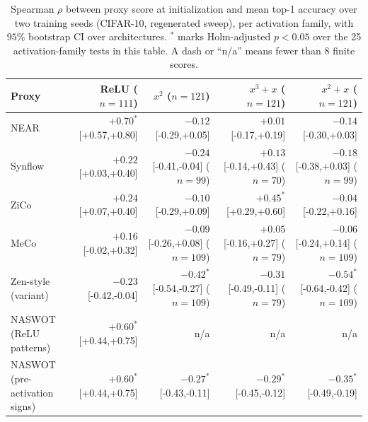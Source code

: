 \begin{table}[h]
\centering
\caption{Spearman $\rho$ between proxy score at initialization and mean top-1 accuracy over two training seeds
  (CIFAR-10, regenerated sweep), per activation family, with $95\%$ bootstrap CI over architectures.
  ${}^{*}$ marks Holm-adjusted $p<0.05$ over the 25 activation-family tests in this table.
  A dash or ``n/a'' means fewer than $8$ finite scores.}
\label{tab:corr}
\small
\begin{tabular}{lrrrr}
\toprule
\textbf{Proxy} & \textbf{ReLU} ($n{=}111$) & \textbf{$x^2$} ($n{=}121$) & \textbf{$x^3{+}x$} ($n{=}121$) & \textbf{$x^2{+}x$} ($n{=}121$) \\
\midrule
NEAR & $+0.70^{*}$ {\scriptsize[+0.57,+0.80]} & $-0.12$ {\scriptsize[-0.29,+0.05]} & $+0.01$ {\scriptsize[-0.17,+0.19]} & $-0.14$ {\scriptsize[-0.30,+0.03]} \\
Synflow & $+0.22$ {\scriptsize[+0.03,+0.40]} & $-0.24$ {\scriptsize[-0.41,-0.04]} {\scriptsize($n{=}99$)} & $+0.13$ {\scriptsize[-0.14,+0.43]} {\scriptsize($n{=}70$)} & $-0.18$ {\scriptsize[-0.38,+0.03]} {\scriptsize($n{=}99$)} \\
ZiCo & $+0.24$ {\scriptsize[+0.07,+0.40]} & $-0.10$ {\scriptsize[-0.29,+0.09]} & $+0.45^{*}$ {\scriptsize[+0.29,+0.60]} & $-0.04$ {\scriptsize[-0.22,+0.16]} \\
MeCo & $+0.16$ {\scriptsize[-0.02,+0.32]} & $-0.09$ {\scriptsize[-0.26,+0.08]} {\scriptsize($n{=}109$)} & $+0.05$ {\scriptsize[-0.16,+0.27]} {\scriptsize($n{=}79$)} & $-0.06$ {\scriptsize[-0.24,+0.14]} {\scriptsize($n{=}109$)} \\
Zen-style (variant) & $-0.23$ {\scriptsize[-0.42,-0.04]} & $-0.42^{*}$ {\scriptsize[-0.54,-0.27]} {\scriptsize($n{=}109$)} & $-0.31$ {\scriptsize[-0.49,-0.11]} {\scriptsize($n{=}79$)} & $-0.54^{*}$ {\scriptsize[-0.64,-0.42]} {\scriptsize($n{=}109$)} \\
NASWOT (ReLU patterns) & $+0.60^{*}$ {\scriptsize[+0.44,+0.75]} & n/a & n/a & n/a \\
NASWOT (pre-activation signs) & $+0.60^{*}$ {\scriptsize[+0.44,+0.75]} & $-0.27^{*}$ {\scriptsize[-0.43,-0.11]} & $-0.29^{*}$ {\scriptsize[-0.45,-0.12]} & $-0.35^{*}$ {\scriptsize[-0.49,-0.19]} \\
\bottomrule
\end{tabular}
\end{table}
